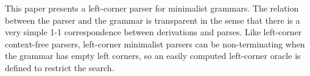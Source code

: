 This paper presents a left-corner parser for minimalist grammars. The relation between the parser and the grammar is transparent in the sense that there is a very simple 1-1 correspondence between derivations and parses. Like left-corner context-free parsers, left-corner minimalist parsers can be non-terminating when the grammar has empty left corners, so an easily computed left-corner oracle is defined to restrict the search.
